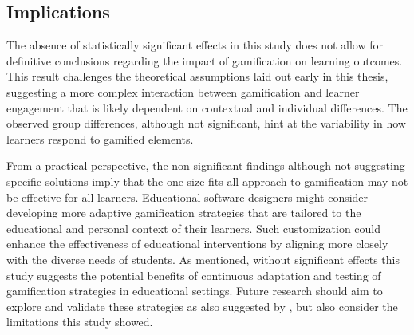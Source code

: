 

\subsection{Implications}
The absence of statistically significant effects in this study does not allow for definitive conclusions regarding the impact of gamification on learning outcomes.
This result challenges the theoretical assumptions laid out early in this thesis, suggesting a more complex interaction between gamification and learner engagement that is likely dependent on contextual and individual differences.
The observed group differences, although not significant, hint at the variability in how learners respond to gamified elements. 

From a practical perspective, the non-significant findings although not suggesting specific solutions imply that the one-size-fits-all approach to gamification may not be effective for all learners.
Educational software designers might consider developing more adaptive gamification strategies that are tailored to the educational and personal context of their learners.
Such customization could enhance the effectiveness of educational interventions by aligning more closely with the diverse needs of students.
As mentioned, without significant effects this study suggests the potential benefits of continuous adaptation and testing of gamification strategies in educational settings.
Future research should aim to explore and validate these strategies as also suggested by \textcite{dehghanzadehUsingGamificationSupport2024,koivistoRiseMotivationalInformation2019,oliveiraTailoredGamificationEducation2023}, but also consider the limitations this study showed.



